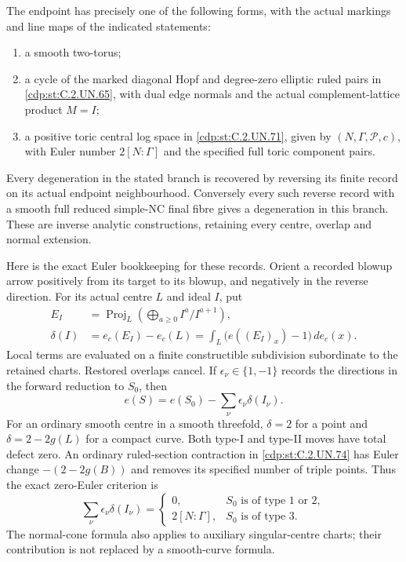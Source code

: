 \begin{proposition}
The endpoint has precisely one of the following forms,
with the actual markings and line maps of the indicated
statements:
\begin{enumerate}
\item a smooth two-torus;
\item a cycle of the marked diagonal Hopf and degree-zero
elliptic ruled pairs in \ref{cdp:st:C.2.UN.65}, with dual edge normals and
the actual complement-lattice product $M=I$;
\item a positive toric central log space in \ref{cdp:st:C.2.UN.71}, given by
$(N,\Gamma,\mathscr P,c)$, with Euler number
$2[N:\Gamma]$ and the specified full toric component pairs.
\end{enumerate}
Every degeneration in the stated branch is recovered by
reversing its finite record on its actual endpoint
neighbourhood. Conversely every such reverse record with
a smooth full reduced simple-NC final fibre gives a
degeneration in this branch. These are inverse analytic
constructions, retaining every centre, overlap and normal
extension.

Here is the exact Euler bookkeeping for these records.
Orient a recorded blowup arrow positively from its target
to its blowup, and negatively in the reverse direction.
For its actual centre $L$ and ideal $I$, put
\[
 \begin{split}
  E_I&=\operatorname{Proj}_L\left(\bigoplus_{a\ge0}
                                      I^a/I^{a+1}\right),\\
  \delta(I)&=e_c(E_I)-e_c(L)
       =\int_L\bigl(e((E_I)_x)-1\bigr)\,de_c(x).
 \end{split}
\tag{C.KG.3}\label{cdp:eq:C.KG.3}
\]
Local terms are evaluated on a finite constructible
subdivision subordinate to the retained charts. Restored
overlaps cancel. If $\epsilon_\nu\in\{1,-1\}$ records
the directions in the forward reduction to $S_0$, then
\[
             e(S)=e(S_0)-\sum_\nu\epsilon_\nu\delta(I_\nu).
\tag{C.KG.4}\label{cdp:eq:C.KG.4}
\]
For an ordinary smooth centre in a smooth threefold,
$\delta=2$ for a point and $\delta=2-2g(L)$ for a compact
curve. Both type-I and type-II moves have total defect
zero. An ordinary ruled-section contraction in \ref{cdp:st:C.2.UN.74} has
Euler change $-(2-2g(B))$ and removes its specified number
of triple points. Thus the exact zero-Euler criterion is
\[
 \sum_\nu\epsilon_\nu\delta(I_\nu)=
 \begin{cases}
 0,&S_0\text{ is of type 1 or 2},\\
 2[N:\Gamma],&S_0\text{ is of type 3}.
 \end{cases}
\tag{C.KG.5}\label{cdp:eq:C.KG.5}
\]
The normal-cone formula also applies to auxiliary
singular-centre charts; their contribution is not
replaced by a smooth-curve formula.


\end{proposition}

